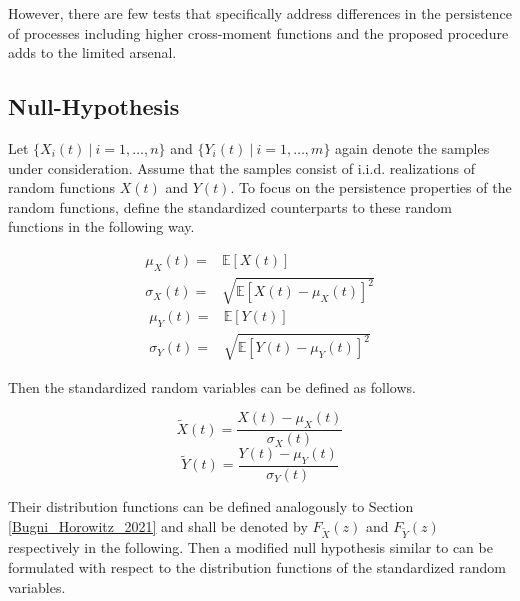 \documentclass[12pt, a4paper]{article}
\theoremstyle{MAstyle} \newtheorem{assumption}{Assumption}[section]
\theoremstyle{MAstyle} \newtheorem{definition}{Definition}[section]
\theoremstyle{MAstyle} \newtheorem{theorem}{Theorem}[section]
\begin{document}
		However, there are few tests that specifically address differences in the persistence of processes including higher cross-moment functions and the proposed procedure adds to the limited arsenal.\\
		
		\subsection{Null-Hypothesis}
		Let $\{X_i(t) \ | \  i = 1, \dots, n\}$ and $\{Y_i(t) \ | \  i = 1, \dots, m\}$ again denote the samples under consideration. Assume that the samples consist of i.i.d. realizations of random functions $X(t)$ and $Y(t)$.
		To focus on the persistence properties of the random functions, define the standardized counterparts to these random functions in the following way.
		\begin{multicols}{2}
			\noindent
			\begin{equation*}
				\begin{split}
					\mu_{X}(t) = &\mathbb{E}\left[X(t)\right] \\
					\sigma_{X}(t) = &\sqrt{\mathbb{E}\left[X(t) - \mu_{X}(t)\right]^2}
				\end{split}
			\end{equation*}
			\begin{equation}
				\begin{split}
					\mu_{Y}(t) = &\mathbb{E}\left[Y(t)\right] \\
					\sigma_{Y}(t) = &\sqrt{\mathbb{E}\left[Y(t) - \mu_{Y}(t)\right]^2}
				\end{split}
			\end{equation}
		\end{multicols}
		Then the standardized random variables can be defined as follows.
		\begin{multicols}{2}
			\noindent
			\begin{equation*}
				\tilde{X}(t) = \frac{X(t) - \mu_{X}(t)}{\sigma_{X}(t)}
			\end{equation*}
			\begin{equation}
				\tilde{Y}(t) = \frac{Y(t) - \mu_{Y}(t)}{\sigma_{Y}(t)}
			\end{equation}
		\end{multicols}
		Their distribution functions can be defined analogously to Section \ref{Bugni_Horowitz_2021} and shall be denoted by $F_{\tilde{X}}(z)$ and $F_{\tilde{Y}}(z)$ respectively in the following. Then a modified null hypothesis similar to \cite{bugni_permutation_2021} can be formulated with respect to the distribution functions of the standardized random variables.
\end{document}
